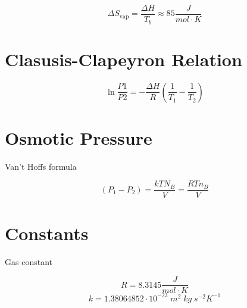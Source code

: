 \documentclass[reprint,english,notitlepage]{revtex4-1}  %
\begin{document}
$$\Delta{S}_{\text{vap}} = \frac{\Delta H }{T_b} \approx 85 \frac{J}{mol \cdot K} $$

\section*{Clasusis-Clapeyron Relation}

$$\ln{\frac{P1}{P2}} = - \frac{\Delta H}{R} \left ( \frac{1}{T_1} - \frac{1}{T_2} \right)$$

\section*{Osmotic Pressure}

Van't Hoffs formula

$$(P_1 - P_2) = \frac{kTN_B}{V} = \frac{RTn_B}{V}$$

\section{Constants}

Gas constant

$$R = 8.3145 \frac{J}{mol \cdot K}$$
$$k = 1.38064852 \cdot 10^{-23} \; m^2 \; kg \; s^{-2} K^{-1}$$
\end{document}
